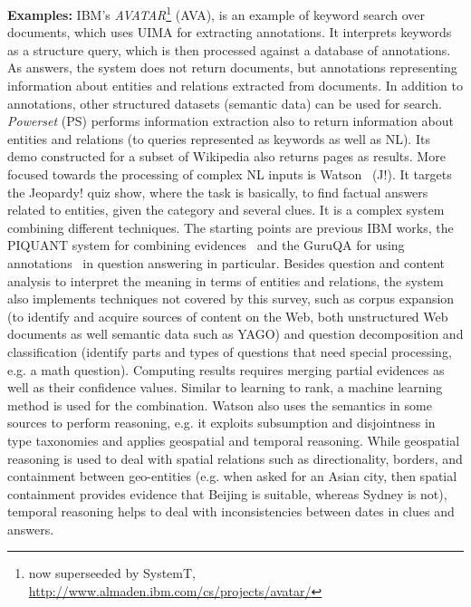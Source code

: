 \textbf{Examples:}
IBM's \emph{AVATAR}\footnote{now superseeded by SystemT, \url{http://www.almaden.ibm.com/cs/projects/avatar/}} (AVA), is an example of keyword search over documents, which uses UIMA for extracting annotations. It interprets keywords as a structure query, which is then processed against a database of annotations. As answers, the system does not return documents, but annotations representing information about entities and relations extracted from documents. In addition to annotations, other structured datasets (semantic data) can be used for search. \emph{Powerset} (PS) performs information extraction also to return information about entities and relations (to queries represented as keywords as well as NL). Its demo constructed for a subset of Wikipedia also returns pages as results. More focused towards the processing of complex NL inputs is Watson~\cite{DBLP:journals/aim/FerrucciBCFGKLMNPSW10} (J!). It targets the Jeopardy! quiz show, where the task is basically, to find factual answers related to entities, given the category and several clues. It is a complex system combining different techniques. The starting points are previous IBM works, the PIQUANT system for combining evidences~\cite{DBLP:conf/naacl/Chu-CarrollCPI03} and the GuruQA for using annotations~\cite{DBLP:conf/sigir/PragerBCR00,DBLP:conf/sigir/Chu-CarrollPCFD06} in question answering in particular. Besides question and content analysis to interpret the meaning in terms of entities and relations, the system also implements techniques not covered by this survey, such as corpus expansion (to identify and acquire sources of content on the Web, both unstructured Web documents as well semantic data such as YAGO) and question decomposition and classification (identify parts and types of questions that need special processing, e.g. a math question). Computing results requires merging partial evidences as well as their confidence values. Similar to learning to rank, a machine learning method is used for the combination. Watson also uses the semantics in some sources to perform reasoning, e.g. it exploits subsumption and
disjointness in type taxonomies and applies geospatial and
temporal reasoning. While geospatial reasoning is used
to deal with spatial
relations such as directionality, borders, and
containment between geo-entities (e.g. when asked for an Asian city, then spatial containment
provides evidence that Beijing is suitable, whereas Sydney is not), temporal reasoning helps to deal with 
inconsistencies between dates in clues and answers. 



